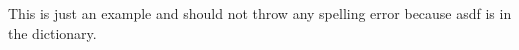 \documentclass[a4paper,11pt,twoside]{scrartcl}
\begin{document}
This is just an example and should not throw any spelling error because asdf is in the dictionary.
\end{document}
